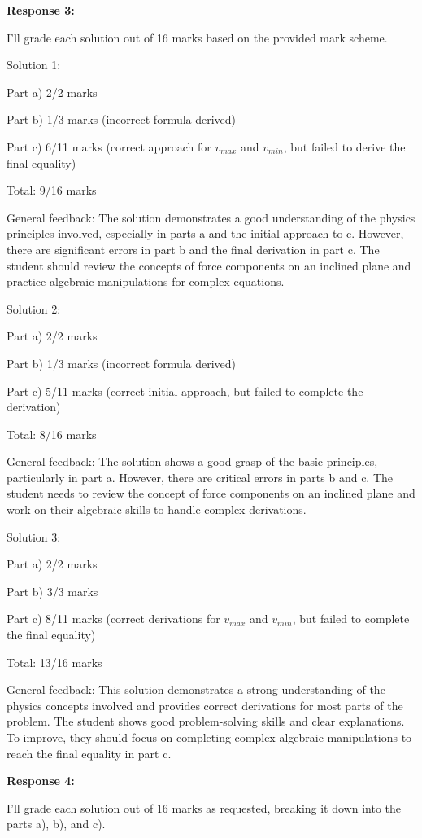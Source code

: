 \documentclass[a4paper,11pt]{article}
\begin{document}
\bigskip
\textbf{Response 3:}

I'll grade each solution out of 16 marks based on the provided mark scheme.

Solution 1:

Part a) 2/2 marks

Part b) 1/3 marks (incorrect formula derived)

Part c) 6/11 marks (correct approach for \(v_{max}\) and \(v_{min}\), but failed to derive the final equality)

Total: 9/16 marks

General feedback: The solution demonstrates a good understanding of the physics principles involved, especially in parts a and the initial approach to c. However, there are significant errors in part b and the final derivation in part c. The student should review the concepts of force components on an inclined plane and practice algebraic manipulations for complex equations.

Solution 2:

Part a) 2/2 marks

Part b) 1/3 marks (incorrect formula derived)

Part c) 5/11 marks (correct initial approach, but failed to complete the derivation)

Total: 8/16 marks

General feedback: The solution shows a good grasp of the basic principles, particularly in part a. However, there are critical errors in parts b and c. The student needs to review the concept of force components on an inclined plane and work on their algebraic skills to handle complex derivations.

Solution 3:

Part a) 2/2 marks

Part b) 3/3 marks

Part c) 8/11 marks (correct derivations for \(v_{max}\) and \(v_{min}\), but failed to complete the final equality)

Total: 13/16 marks

General feedback: This solution demonstrates a strong understanding of the physics concepts involved and provides correct derivations for most parts of the problem. The student shows good problem-solving skills and clear explanations. To improve, they should focus on completing complex algebraic manipulations to reach the final equality in part c.

\bigskip
\textbf{Response 4:}

I'll grade each solution out of 16 marks as requested, breaking it down into the parts a), b), and c).
\end{document}
